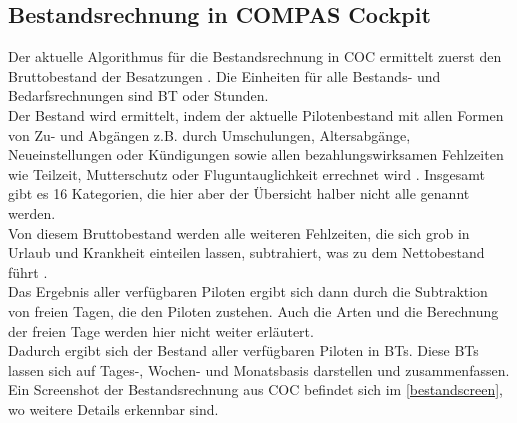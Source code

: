 \documentclass [12pt, a4paper, oneside, titlepage, ngerman]{article}
\begin{document}
\subsection{Bestandsrechnung in COMPAS Cockpit} \label{bestandsrechnung}
Der aktuelle Algorithmus für die Bestandsrechnung in \ac{COC} ermittelt zuerst den Bruttobestand der Besatzungen \cite[vgl.][S.8]{capfunc}. Die Einheiten für alle Bestands- und Bedarfsrechnungen sind \ac{BT} oder Stunden. \\
Der Bestand wird ermittelt, indem der aktuelle Pilotenbestand mit allen Formen von Zu- und Abgängen z.B. durch Umschulungen, Altersabgänge, Neueinstellungen oder Kündigungen sowie allen bezahlungswirksamen Fehlzeiten wie Teilzeit, Mutterschutz oder Fluguntauglichkeit errechnet wird \cite[vgl.][S.19]{benutzerhandbuch}. Insgesamt gibt es 16 Kategorien, die hier aber der Übersicht halber nicht alle genannt werden. \\
Von diesem Bruttobestand werden alle weiteren Fehlzeiten, die sich grob in Urlaub und Krankheit einteilen lassen, subtrahiert, was zu dem Nettobestand führt \cite[vgl.][S.8]{capfunc}. \\
Das Ergebnis aller verfügbaren Piloten ergibt sich dann durch die Subtraktion von freien Tagen, die den Piloten zustehen. Auch die Arten und die Berechnung der freien Tage werden hier nicht weiter erläutert. \\
Dadurch ergibt sich der Bestand aller verfügbaren Piloten in \acp{BT}. Diese \acp{BT} lassen sich auf Tages-, Wochen- und Monatsbasis darstellen und zusammenfassen. Ein Screenshot der Bestandsrechnung aus \ac{COC} befindet sich im \autoref{bestandscreen}, wo weitere Details erkennbar sind.
\end{document}
